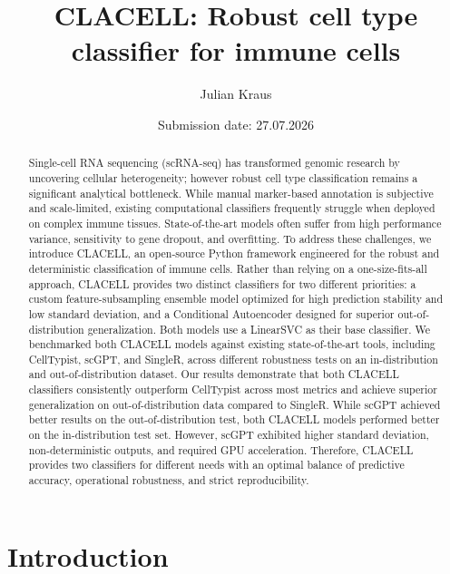 \documentclass[11pt]{article}
\title{CLACELL: Robust cell type classifier for immune cells}
\author{Julian Kraus}
\affil{
Project report\\ %
Module title: Project Biomedical Network Science\\%
Semester: SS2026\\%
Matriculation number: 23766907\\
Biomedical Network Science Lab, Department Artificial Intelligence in Biomedical Engineering, Friedrich-Alexander-Universität Erlangen-Nürnberg}
\date{Submission date: 27.07.2026}
\begin{document}
\maketitle

\begin{abstract}
Single-cell RNA sequencing (scRNA-seq) has transformed genomic research by uncovering cellular heterogeneity; however robust cell type classification remains a significant analytical bottleneck. While manual marker-based annotation is subjective and scale-limited, existing computational classifiers frequently struggle when deployed on complex immune tissues. State-of-the-art models often suffer from high performance variance, sensitivity to gene dropout, and overfitting. 
To address these challenges, we introduce CLACELL, an open-source Python framework engineered for the robust and deterministic classification of immune cells. Rather than relying on a one-size-fits-all approach, CLACELL provides two distinct classifiers for two different priorities: a custom feature-subsampling ensemble model optimized for high prediction stability and low standard deviation, and a Conditional Autoencoder designed for superior out-of-distribution generalization. Both models use a LinearSVC as their base classifier.
We benchmarked both CLACELL models against existing state-of-the-art tools, including CellTypist, scGPT, and SingleR, across different robustness tests on an in-distribution and out-of-distribution dataset. Our results demonstrate that both CLACELL classifiers consistently outperform CellTypist across most metrics and achieve superior generalization on out-of-distribution data compared to SingleR. While scGPT achieved better results on the out-of-distribution test, both CLACELL models performed better on the in-distribution test set. However, scGPT exhibited higher standard deviation, non-deterministic outputs, and required GPU acceleration. Therefore, CLACELL provides two classifiers for different needs with an optimal balance of predictive accuracy, operational robustness, and strict reproducibility.
\end{abstract}

\clearpage

\tableofcontents

\clearpage

\section{Introduction}\label{sec:introduction}
\end{document}

